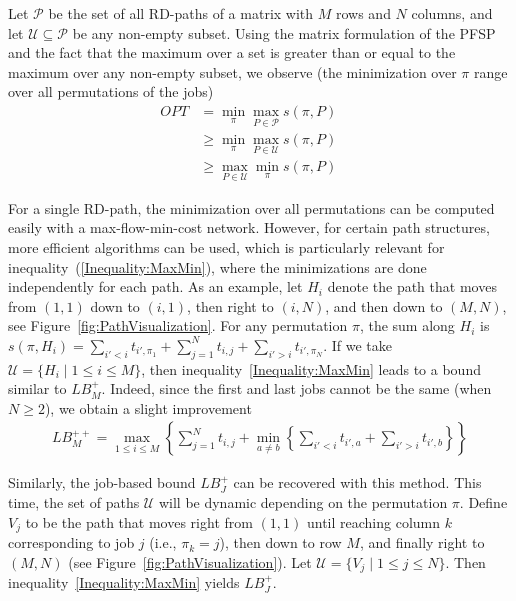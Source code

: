 \documentclass{article}
\theoremstyle{thmstyleone}%
\theoremstyle{thmstyletwo}%
\theoremstyle{thmstylethree}%
\begin{document}
Let $\mathcal{P}$ be the set of all RD-paths of a matrix with $M$ rows and $N$ columns, and let $\mathcal{U} \subseteq \mathcal{P}$ be any non-empty subset. 
Using the matrix formulation of the PFSP and the fact that the maximum over a set is greater than or equal to the maximum over any non-empty subset, we observe (the minimization over $\pi$ range over all permutations of the jobs)
\begin{align}
    OPT &= \min_{\pi} \max_{P \in \mathcal{P}} s(\pi, P)  && \label{Equality:Makespan}\\
    &\geq \min_{\pi} \max_{P \in \mathcal{U}} s(\pi, P) && \label{Inequality:MinMax}\\
    &\geq \max_{P \in \mathcal{U}} \min_{\pi} s(\pi, P) && \label{Inequality:MaxMin}
\end{align}

For a single RD-path, the minimization over all permutations can be computed easily with a max-flow-min-cost network. 
However, for certain path structures, more efficient algorithms can be used,  
which is particularly relevant for inequality~(\ref{Inequality:MaxMin}), where the minimizations are done independently for each path. 
As an example, let $H_i$ denote the path that moves from $(1,1)$ down to $(i,1)$, then right to $(i,N)$, and then down to $(M,N)$, see Figure~\ref{fig:PathVisualization}. 
For any permutation $\pi$, the sum along $H_i$ is $s(\pi, H_i) = \sum_{i' < i} t_{i', \pi_1} + \sum_{j=1}^N t_{i,j} + \sum_{i' > i} t_{i', \pi_N}$.  
If we take $\mathcal{U} = \{H_i \mid 1 \leq i \leq M\}$, then inequality~\eqref{Inequality:MaxMin} leads to a bound similar to $LB_M^+$. Indeed, since the first and last jobs cannot be the same (when $N \geq 2$), we obtain a slight improvement
\begin{align*}
    LB_M^{++} = \max_{1 \leq i \leq M} \left\{ \sum_{j=1}^N t_{i,j} + \min_{a \neq b} \left\{ \sum_{i' < i} t_{i', a} + \sum_{i' > i} t_{i', b}  \right\} \right\}
\end{align*}


Similarly, the job-based bound $LB_J^+$ can be recovered with this method. 
This time, the set of paths $\mathcal{U}$ will be dynamic depending on the permutation $\pi$.  
Define $V_j$ to be the path that moves right from $(1,1)$ until reaching column $k$ corresponding to job $j$ (i.e., $\pi_k = j$), then down to row $M$, and finally right to $(M, N)$ (see Figure~\ref{fig:PathVisualization}). Let $\mathcal{U} = \{V_j \mid 1 \leq j \leq N\}$. Then inequality~\eqref{Inequality:MaxMin} yields $LB_J^+$.
\end{document}
